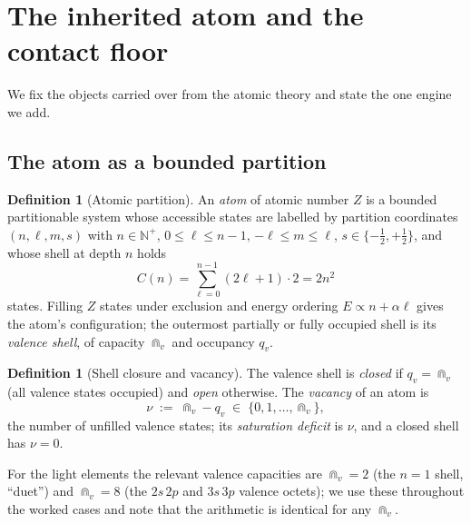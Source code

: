 \documentclass[11pt,twocolumn,a4paper]{article}
\theoremstyle{thmstyle}
\theoremstyle{definition}
\newtheorem{definition}[theorem]{Definition}
\theoremstyle{remark}
\newcommand{\N}{\mathbb{N}}
\newcommand{\vac}{\nu}                 %
\newcommand{\Shellcap}{C}
\begin{document}
\section{The inherited atom and the contact floor}
\label{sec:setting}

We fix the objects carried over from the atomic theory and state the one
engine we add.

\subsection{The atom as a bounded partition}

\begin{definition}[Atomic partition]
\label{def:atom}
An \emph{atom} of atomic number $Z$ is a bounded partitionable system
whose accessible states are labelled by partition coordinates
$(n,\ell,m,s)$ with $n\in\N^{+}$, $0\le\ell\le n-1$, $-\ell\le m\le\ell$,
$s\in\{-\tfrac12,+\tfrac12\}$, and whose shell at depth $n$ holds
\[
\Shellcap(n)=\sum_{\ell=0}^{n-1}(2\ell+1)\cdot 2=2n^{2}
\]
states. Filling $Z$ states under exclusion and energy ordering
$E\propto n+\alpha\ell$ gives the atom's configuration; the outermost
partially or fully occupied shell is its \emph{valence shell}, of
capacity $\Cap_v$ and occupancy $q_v$.
\end{definition}

\begin{definition}[Shell closure and vacancy]
\label{def:vacancy}
The valence shell is \emph{closed} if $q_v=\Cap_v$ (all valence states
occupied) and \emph{open} otherwise. The \emph{vacancy} of an atom is
\[
\vac \;:=\; \Cap_v - q_v \;\in\;\{0,1,\dots,\Cap_v\},
\]
the number of unfilled valence states; its \emph{saturation deficit} is
$\vac$, and a closed shell has $\vac=0$.
\end{definition}

For the light elements the relevant valence capacities are
$\Cap_v=2$ (the $n=1$ shell, ``duet'') and $\Cap_v=8$ (the
$2s\,2p$ and $3s\,3p$ valence octets); we use these throughout the
worked cases and note that the arithmetic is identical for any $\Cap_v$.
\end{document}

